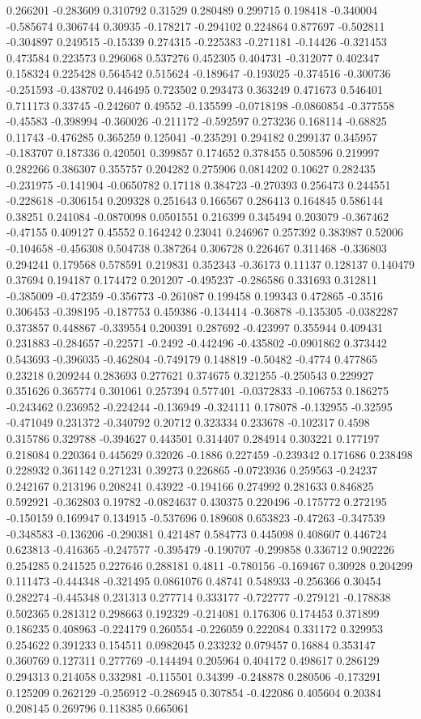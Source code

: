 0.266201 -0.283609 0.310792 0.31529 0.280489 0.299715 0.198418 -0.340004 -0.585674 0.306744 0.30935 -0.178217 -0.294102 0.224864 0.877697 -0.502811 -0.304897 0.249515 -0.15339 0.274315 -0.225383 -0.271181 -0.14426 -0.321453 0.473584 0.223573 0.296068 0.537276 0.452305 0.404731 -0.312077 0.402347 0.158324 0.225428 0.564542 0.515624 -0.189647 -0.193025 -0.374516 -0.300736 -0.251593 -0.438702 0.446495 0.723502 0.293473 0.363249 0.471673 0.546401 0.711173 0.33745 -0.242607 0.49552 -0.135599 -0.0718198 -0.0860854 -0.377558 -0.45583 -0.398994 -0.360026 -0.211172 -0.592597 0.273236 0.168114 -0.68825 0.11743 -0.476285 0.365259 0.125041 -0.235291 0.294182 0.299137 0.345957 -0.183707 0.187336 0.420501 0.399857 0.174652 0.378455 0.508596 0.219997 0.282266 0.386307 0.355757 0.204282 0.275906 0.0814202 0.10627 0.282435 -0.231975 -0.141904 -0.0650782 0.17118 0.384723 -0.270393 0.256473 0.244551 -0.228618 -0.306154 0.209328 0.251643 0.166567 0.286413 0.164845 0.586144 0.38251 0.241084 -0.0870098 0.0501551 0.216399 0.345494 0.203079 -0.367462 -0.47155 0.409127 0.45552 0.164242 0.23041 0.246967 0.257392 0.383987 0.52006 -0.104658 -0.456308 0.504738 0.387264 0.306728 0.226467 0.311468 -0.336803 0.294241 0.179568 0.578591 0.219831 0.352343 -0.36173 0.11137 0.128137 0.140479 0.37694 0.194187 0.174472 0.201207 -0.495237 -0.286586 0.331693 0.312811 -0.385009 -0.472359 -0.356773 -0.261087 0.199458 0.199343 0.472865 -0.3516 0.306453 -0.398195 -0.187753 0.459386 -0.134414 -0.36878 -0.135305 -0.0382287 0.373857 0.448867 -0.339554 0.200391 0.287692 -0.423997 0.355944 0.409431 0.231883 -0.284657 -0.22571 -0.2492 -0.442496 -0.435802 -0.0901862 0.373442 0.543693 -0.396035 -0.462804 -0.749179 0.148819 -0.50482 -0.4774 0.477865 0.23218 0.209244 0.283693 0.277621 0.374675 0.321255 -0.250543 0.229927 0.351626 0.365774 0.301061 0.257394 0.577401 -0.0372833 -0.106753 0.186275 -0.243462 0.236952 -0.224244 -0.136949 -0.324111 0.178078 -0.132955 -0.32595 -0.471049 0.231372 -0.340792 0.20712 0.323334 0.233678 -0.102317 0.4598 0.315786 0.329788 -0.394627 0.443501 0.314407 0.284914 0.303221 0.177197 0.218084 0.220364 0.445629 0.32026 -0.1886 0.227459 -0.239342 0.171686 0.238498 0.228932 0.361142 0.271231 0.39273 0.226865 -0.0723936 0.259563 -0.24237 0.242167 0.213196 0.208241 0.43922 -0.194166 0.274992 0.281633 0.846825 0.592921 -0.362803 0.19782 -0.0824637 0.430375 0.220496 -0.175772 0.272195 -0.150159 0.169947 0.134915 -0.537696 0.189608 0.653823 -0.47263 -0.347539 -0.348583 -0.136206 -0.290381 0.421487 0.584773 0.445098 0.408607 0.446724 0.623813 -0.416365 -0.247577 -0.395479 -0.190707 -0.299858 0.336712 0.902226 0.254285 0.241525 0.227646 0.288181 0.4811 -0.780156 -0.169467 0.30928 0.204299 0.111473 -0.444348 -0.321495 0.0861076 0.48741 0.548933 -0.256366 0.30454 0.282274 -0.445348 0.231313 0.277714 0.333177 -0.722777 -0.279121 -0.178838 0.502365 0.281312 0.298663 0.192329 -0.214081 0.176306 0.174453 0.371899 0.186235 0.408963 -0.224179 0.260554 -0.226059 0.222084 0.331172 0.329953 0.254622 0.391233 0.154511 0.0982045 0.233232 0.079457 0.16884 0.353147 0.360769 0.127311 0.277769 -0.144494 0.205964 0.404172 0.498617 0.286129 0.294313 0.214058 0.332981 -0.115501 0.34399 -0.248878 0.280506 -0.173291 0.125209 0.262129 -0.256912 -0.286945 0.307854 -0.422086 0.405604 0.20384 0.208145 0.269796 0.118385 0.665061 
